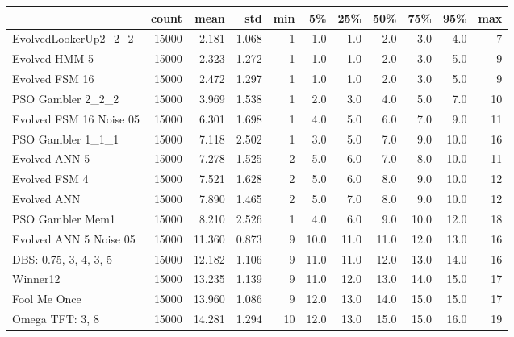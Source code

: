 \begin{tabular}{lrrrrrrrrrr}
\toprule
{} &  count &    mean &    std &  min &    5\% &   25\% &   50\% &   75\% &   95\% &  max \\
\midrule
EvolvedLookerUp2\_2\_2    &  15000 &   2.181 &  1.068 &    1 &   1.0 &   1.0 &   2.0 &   3.0 &   4.0 &    7 \\
Evolved HMM 5           &  15000 &   2.323 &  1.272 &    1 &   1.0 &   1.0 &   2.0 &   3.0 &   5.0 &    9 \\
Evolved FSM 16          &  15000 &   2.472 &  1.297 &    1 &   1.0 &   1.0 &   2.0 &   3.0 &   5.0 &    9 \\
PSO Gambler 2\_2\_2       &  15000 &   3.969 &  1.538 &    1 &   2.0 &   3.0 &   4.0 &   5.0 &   7.0 &   10 \\
Evolved FSM 16 Noise 05 &  15000 &   6.301 &  1.698 &    1 &   4.0 &   5.0 &   6.0 &   7.0 &   9.0 &   11 \\
PSO Gambler 1\_1\_1       &  15000 &   7.118 &  2.502 &    1 &   3.0 &   5.0 &   7.0 &   9.0 &  10.0 &   16 \\
Evolved ANN 5           &  15000 &   7.278 &  1.525 &    2 &   5.0 &   6.0 &   7.0 &   8.0 &  10.0 &   11 \\
Evolved FSM 4           &  15000 &   7.521 &  1.628 &    2 &   5.0 &   6.0 &   8.0 &   9.0 &  10.0 &   12 \\
Evolved ANN             &  15000 &   7.890 &  1.465 &    2 &   5.0 &   7.0 &   8.0 &   9.0 &  10.0 &   12 \\
PSO Gambler Mem1        &  15000 &   8.210 &  2.526 &    1 &   4.0 &   6.0 &   9.0 &  10.0 &  12.0 &   18 \\
Evolved ANN 5 Noise 05  &  15000 &  11.360 &  0.873 &    9 &  10.0 &  11.0 &  11.0 &  12.0 &  13.0 &   16 \\
DBS: 0.75, 3, 4, 3, 5   &  15000 &  12.182 &  1.106 &    9 &  11.0 &  11.0 &  12.0 &  13.0 &  14.0 &   16 \\
Winner12                &  15000 &  13.235 &  1.139 &    9 &  11.0 &  12.0 &  13.0 &  14.0 &  15.0 &   17 \\
Fool Me Once            &  15000 &  13.960 &  1.086 &    9 &  12.0 &  13.0 &  14.0 &  15.0 &  15.0 &   17 \\
Omega TFT: 3, 8         &  15000 &  14.281 &  1.294 &   10 &  12.0 &  13.0 &  15.0 &  15.0 &  16.0 &   19 \\
\bottomrule
\end{tabular}
